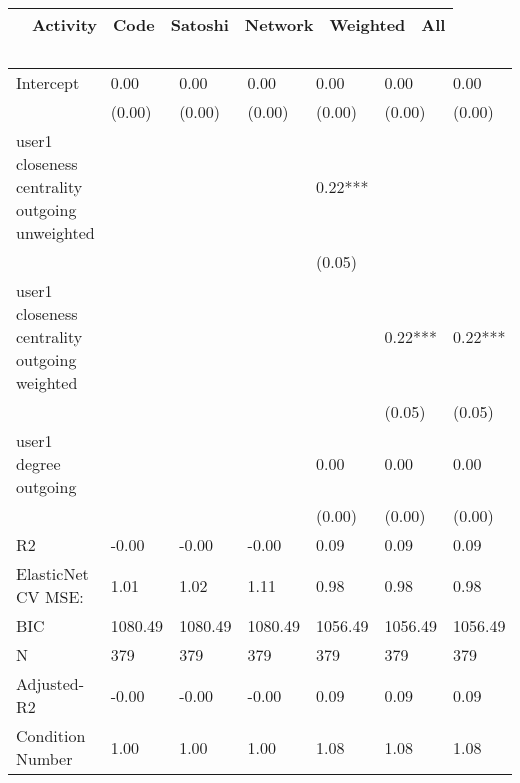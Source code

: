 \begin{table}
\caption{}
\begin{center}
\begin{tabular}{lcccccc}
\hline
                                               & Activity &   Code  & Satoshi & Network & Weighted &   All    \\
\hline
\hline
\end{tabular}
\begin{tabular}{lllllll}
Intercept                                      & 0.00     & 0.00    & 0.00    & 0.00    & 0.00     & 0.00     \\
                                               & (0.00)   & (0.00)  & (0.00)  & (0.00)  & (0.00)   & (0.00)   \\
user1 closeness centrality outgoing unweighted &          &         &         & 0.22*** &          &          \\
                                               &          &         &         & (0.05)  &          &          \\
user1 closeness centrality outgoing weighted   &          &         &         &         & 0.22***  & 0.22***  \\
                                               &          &         &         &         & (0.05)   & (0.05)   \\
user1 degree outgoing                          &          &         &         & 0.00    & 0.00     & 0.00     \\
                                               &          &         &         & (0.00)  & (0.00)   & (0.00)   \\
R2                                             & -0.00    & -0.00   & -0.00   & 0.09    & 0.09     & 0.09     \\
ElasticNet CV MSE:                             & 1.01     & 1.02    & 1.11    & 0.98    & 0.98     & 0.98     \\
BIC                                            & 1080.49  & 1080.49 & 1080.49 & 1056.49 & 1056.49  & 1056.49  \\
N                                              & 379      & 379     & 379     & 379     & 379      & 379      \\
Adjusted-R2                                    & -0.00    & -0.00   & -0.00   & 0.09    & 0.09     & 0.09     \\
Condition Number                               & 1.00     & 1.00    & 1.00    & 1.08    & 1.08     & 1.08     \\
\hline
\end{tabular}
\end{center}
\end{table}